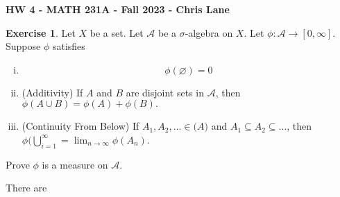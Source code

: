 \documentclass[11pt,oneside]{article}
\numberwithin{equation}{section}
\theoremstyle{definition}
\newtheorem{exercise}{Exercise}
\begin{document}
\textbf{HW 4 - MATH 231A - Fall 2023 - Chris Lane}
\begin{exercise}
  Let $X$ be a set.  Let $\mathcal{A}$ be a $\sigma$-algebra on $X$.  Let $\phi : \mathcal{A} \to [0, \infty]$.
  Suppose $ \phi$ satisfies
  \begin{enumerate}[(i)]
  \item
    $$
    \phi (\varnothing) = 0
    $$
  \item
    (Additivity) If $A$ and $B$ are disjoint sets in $\mathcal{A}$, then $\phi( A \cup B) = \phi(A) + \phi(B).$
  \item
    (Continuity From Below) If $A_1, A_2, ... \in \mathcal(A)$ and $A_1 \subseteq A_2 \subseteq ...$, then
    $\phi ( \bigcup \limits _ {i=1} ^ {\infty} = \lim _{n \to \infty} \phi (A_n)$.
  \end{enumerate}
  Prove $\phi$ is a measure on $\mathcal{A}$. 
\end{exercise}
\begin{solution}
  There are 

\end{solution}
\end{document}
